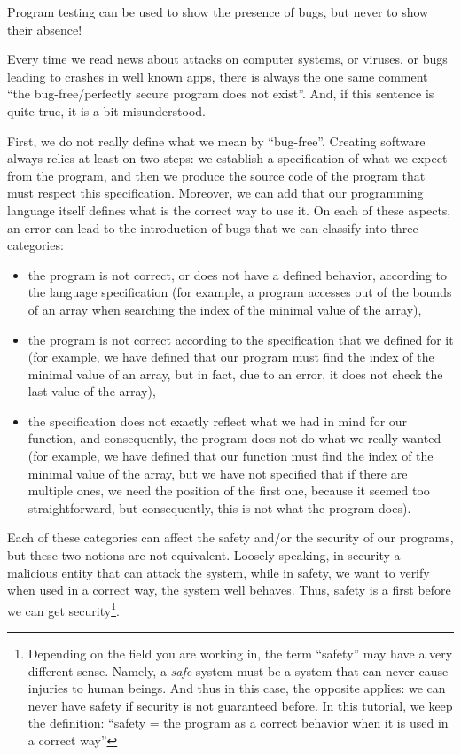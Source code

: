 \begin{Quotation}[Dijkstra]
Program testing can be used to show the presence of bugs, but never to show
their absence!
\end{Quotation}




Every time we read news about attacks on computer systems, or
viruses, or bugs leading to crashes in well known apps, there is always
the one same comment ``the bug-free/perfectly secure program does not
exist''. And, if this sentence is quite true, it is a bit misunderstood.


First, we do not really define what we mean by ``bug-free''. Creating
software always relies at least on two steps: we establish a specification
of what we expect from the program, and then we produce the source code of
the program that must respect this specification. Moreover, we can add that
our programming language itself defines what is the correct way to use it.
On each of these aspects, an error can lead to the introduction of bugs that
we can classify into three categories:
\begin{itemize}
\item the program is not correct, or does not have a defined behavior,
      according to the language specification (for example, a program
      accesses out of the bounds of an array when searching the index of
      the minimal value of the array),
\item the program is not correct according to the specification that we
      defined for it (for example, we have defined that our program must
      find the index of the minimal value of an array, but in fact, due to
      an error, it does not check the last value of the array),
\item the specification does not exactly reflect what we had in mind for
      our function, and consequently, the program does not do what we really
      wanted (for example, we have defined that our function must find the
      index of the minimal value of the array, but we have not specified that
      if there are multiple ones, we need the position of the first one,
      because it seemed too straightforward, but consequently, this is not
      what the program does).
\end{itemize}


Each of these categories can affect the safety and/or the security of our
programs, but these two notions are not equivalent. Loosely speaking,
in security a malicious entity that can attack the system, while in safety, we
want to verify when used in a correct way, the system well behaves. Thus, safety
is a first before we can get security\footnote{Depending on the field you are
  working in, the term ``safety'' may have a very different sense. Namely, a
  \textit{safe} system must be a system that can never cause injuries to human
  beings. And thus in this case, the opposite applies: we can never have safety
  if security is not guaranteed before. In this tutorial, we keep the definition:
  ``safety = the program as a correct behavior when it is used in a correct way''}.


